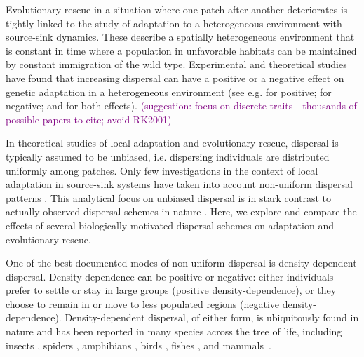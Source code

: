 \documentclass[a4paper,11pt]{article}
\newcommand{\florence}[1]{\textcolor{purple}{(#1)}} %
\newcommand{\chg}[1]{\textcolor{change}{#1}}
\begin{document}
Evolutionary rescue in a situation where one patch after \chg{another} deteriorates is tightly linked to the study of adaptation to a heterogeneous environment with source-sink dynamics. These describe a spatially heterogeneous environment that is constant in time where a population in unfavorable habitats can be maintained by constant immigration of the wild type. Experimental and theoretical studies have found that \chg{increasing} dispersal can have a positive or a negative effect on genetic adaptation in a heterogeneous environment (see e.g. \citet{holt_1997,gomulkiewicz_1999} for positive; \citet{storfer_1998,garcia_1997,kirkpatrick_1997,fedorka_2012} for negative; and \chg{\citet{kawecki_2000,ronce_2001,gallet_2018}} for both effects).
\florence{suggestion: focus on discrete traits - thousands of possible papers to cite; avoid RK2001}

In theoretical studies of local adaptation and evolutionary rescue, dispersal is typically assumed to be \chg{unbiased}, i.e. dispersing individuals are distributed uniformly among patches. Only few investigations in the context of local adaptation in source-sink systems have taken into account non-\chg{uniform} dispersal patterns \citep[e.g.][]{kawecki_1995,holt_1996,kawecki_2002,amarasekare_2004}. This analytical focus on \chg{unbiased} dispersal is in stark contrast to actually observed dispersal schemes in nature \citep[][]{edelaar_2008,clobert_2009,edelaar_2012}. Here, we explore and compare the effects of several biologically motivated dispersal schemes on adaptation and evolutionary rescue.

One of the best documented modes of non-\chg{uniform} dispersal is density-dependent dispersal. Density dependence can be positive or negative: either individuals prefer to settle or stay in large groups (positive density-dependence), or they choose to remain in or move to less populated regions (negative density-dependence). Density-dependent dispersal, of either form, is ubiquitously found in nature and has been reported in many species across the tree of life, including insects \citep{endriss_2019}, spiders \citep{meester2010}, amphibians \citep{gautier_2006}, birds \citep{wilson_2017}, fishes \citep{turgeon_2012}, and mammals~\citep{stoen_2006}.
\end{document}
